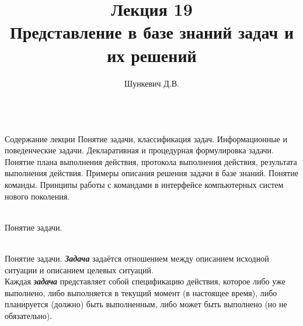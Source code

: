 \title{Лекция 19\\Представление в базе знаний задач и их решений}
\author[]{Шункевич Д.В.}

\begin{frame}
	\titlepage
\end{frame}


\begin{frame}{\\Содержание лекции}
	\topline
	\justifying
	Понятие задачи, классификация задач. Информационные и поведенческие задачи. Декларативная и процедурная формулировка задачи. Понятие плана выполнения действия, протокола выполнения действия, результата выполнения действия. Примеры описания решения задачи в базе знаний. Понятие команды. Принципы работы с командами в интерфейсе компьютерных систем нового поколения. 
\end{frame}

\begin{frame}{\\Понятие задачи.}
	\topline
	\justifying
    \begin{SCn}
    \end{SCn}
\end{frame}

\begin{frame}{\\Понятие задачи.}
	\topline
	\justifying
    \textbf{\textit{Задача}} задаётся отношением  между описанием исходной ситуации и описанием целевых ситуаций.\\
    Каждая \textbf{\textit{задача}} представляет собой спецификацию действия, которое либо уже выполнено, либо выполняется в текущий момент (в настоящее время), либо планируется (должно) быть выполненным, либо может быть выполнено (но не обязательно). 
\end{frame}


